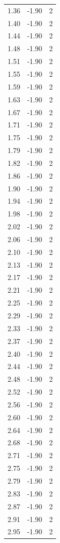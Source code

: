 \begin{longtable}{lrr}
  1.36 & -1.90 & 2 \\
  1.40 & -1.90 & 2 \\
  1.44 & -1.90 & 2 \\
  1.48 & -1.90 & 2 \\
  1.51 & -1.90 & 2 \\
  1.55 & -1.90 & 2 \\
  1.59 & -1.90 & 2 \\
  1.63 & -1.90 & 2 \\
  1.67 & -1.90 & 2 \\
  1.71 & -1.90 & 2 \\
  1.75 & -1.90 & 2 \\
  1.79 & -1.90 & 2 \\
  1.82 & -1.90 & 2 \\
  1.86 & -1.90 & 2 \\
  1.90 & -1.90 & 2 \\
  1.94 & -1.90 & 2 \\
  1.98 & -1.90 & 2 \\
  2.02 & -1.90 & 2 \\
  2.06 & -1.90 & 2 \\
  2.10 & -1.90 & 2 \\
  2.13 & -1.90 & 2 \\
  2.17 & -1.90 & 2 \\
  2.21 & -1.90 & 2 \\
  2.25 & -1.90 & 2 \\
  2.29 & -1.90 & 2 \\
  2.33 & -1.90 & 2 \\
  2.37 & -1.90 & 2 \\
  2.40 & -1.90 & 2 \\
  2.44 & -1.90 & 2 \\
  2.48 & -1.90 & 2 \\
  2.52 & -1.90 & 2 \\
  2.56 & -1.90 & 2 \\
  2.60 & -1.90 & 2 \\
  2.64 & -1.90 & 2 \\
  2.68 & -1.90 & 2 \\
  2.71 & -1.90 & 2 \\
  2.75 & -1.90 & 2 \\
  2.79 & -1.90 & 2 \\
  2.83 & -1.90 & 2 \\
  2.87 & -1.90 & 2 \\
  2.91 & -1.90 & 2 \\
  2.95 & -1.90 & 2 \\

\end{longtable}
